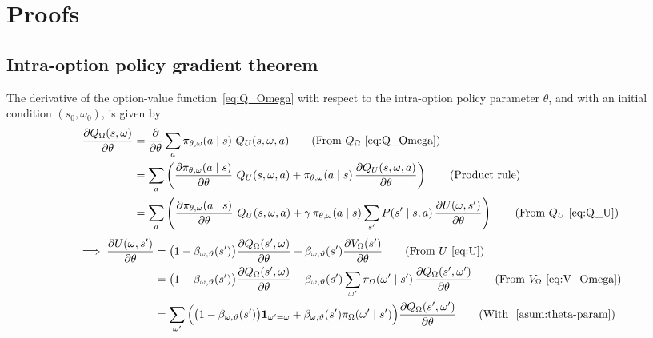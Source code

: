 \section*{Proofs}

\subsection*{Intra-option policy gradient theorem~\cite{bacon2017option}}

The derivative of the option-value function~\eqref{eq:Q_Omega} with respect to the intra-option policy parameter \( \theta \), and with an initial condition \( (s_0, \omega_0) \), is given by
\begin{align}
    \frac{\partial Q_\Omega(s, \omega)}{\partial \theta}
     & =
    \frac{\partial}{\partial \theta} \sum_{a} \pi_{\theta, \omega}(a \mid s) \ Q_U(s, \omega, a)
    \tag{From \( Q_\Omega \)~\eqref{eq:Q_Omega}}
    \\ & =
    \sum_{a} \left( \frac{\partial \pi_{\theta, \omega}(a \mid s)}{\partial \theta}  \ Q_U(s, \omega, a) + \pi_{\theta, \omega}(a \mid s) \, \frac{\partial Q_U(s, \omega, a)}{\partial \theta} \right)
    \tag{Product rule}
    \\ & =
    \sum_{a} \left( \frac{\partial \pi_{\theta, \omega}(a \mid s)}{\partial \theta}  \ Q_U(s, \omega, a) + \gamma \, \pi_{\theta, \omega}(a \mid s) \sum_{s'} P(s' \mid s, a) \, \frac{\partial U(\omega, s')}{\partial \theta} \right)
    \tag{From \( Q_U \)~\eqref{eq:Q_U}}
\end{align}
\begin{align}
    \implies
    \frac{\partial U(\omega, s')}{\partial \theta}
     & =
    \big( 1 - \beta_{\omega, \vartheta}(s') \big) \frac{\partial Q_\Omega(s', \omega)}{\partial \theta} + \beta_{\omega, \vartheta}(s') \frac{\partial V_\Omega(s')}{\partial \theta}
    \tag{From \( U \)~\eqref{eq:U}}
    \\ & =
    \big( 1 - \beta_{\omega, \vartheta}(s') \big) \frac{\partial Q_\Omega(s', \omega)}{\partial \theta} + \beta_{\omega, \vartheta}(s') \sum_{\omega'} \pi_\Omega(\omega' \mid s') \, \frac{\partial Q_\Omega(s', \omega')}{\partial \theta}
    \tag{From \( V_\Omega \)~\eqref{eq:V_Omega}}
    \\ & =
    \sum_{\omega'} \Big( \big( 1 - \beta_{\omega, \vartheta}(s') \big) \mathbf{1}_{\omega' = \omega} + \beta_{\omega, \vartheta}(s') \pi_\Omega(\omega' \mid s') \Big) \frac{\partial Q_\Omega(s', \omega')}{\partial \theta}
    \tag{With ~\ref{asum:theta-param}}
\end{align}
